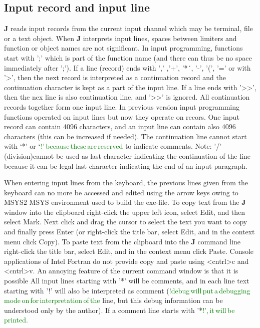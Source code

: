\subsection{Input record and input line}
\label{inpuline}
\textbf{J} reads input records from the current input channel which may be terminal, file or a text object.
When \textbf{J} interprets input lines, spaces between limiters and function or object names are not
significant. In input programming, functions start with ';' which is part of the function name (and
there can thus be no space immediately after ';'). If a line (record) ends with ',' ,'+', '*´, '-',
'(', '=' or with '>', then the next record is interpreted as a continuation record and
the continuation character is kept as a part of the input
line. If a line ends with '>>', then
the nex line is also continuation line, and  '>>' is ignored. All continuation
records together form one input line. In previous version input programming functions operated on input lines
but now they operate on recors. One input record can contain 4096 characters, and an input line can contain also 4096 characters
(this can be increased if needed).
The continuation line cannot start with ‘*’ or ‘\textcolor{green}{!’\,because\,these\,are\,reserved}
to indicate comments.  Note: '/' (division)cannot be used as last character indicating the continuation of the line because it can
be legal last character indicating the end of an input paragraph.

When entering input lines from the keyboard, the previous lines given from the keyboard can no more be
accessed and edited using the arrow keys owing to MSYS2 MSYS environment used to build the exe-file.
To copy text from the \textbf{J} window into the clipboard right-click the upper left icon, select Edit,
and then select Mark. Next click and drag the cursor to select the text you want to copy and
finally press Enter (or right-click the title bar, select Edit, and in the context menu click Copy).
To paste text from the clipboard into the \textbf{J} command line right-click the title bar, select Edit,
and in the context menu click Paste. Console applications of Intel Fortran do not provide copy
and paste using <cntrl>c and <cntrl>v. An annoying feature of the current command window is that it is possible
All input lines starting with '*' will be comments, and in each line text starting with '!' will also
be interpreted as comment (\textcolor{green}{!debug\,will\,put\,a\,debugging\,mode\,on\,for\,interpretation\,of\,the}
line, but this debug information can be understood only by the author). If a comment line starts
with '*\textcolor{green}{!',\,it\,will\,be\,printed.}
